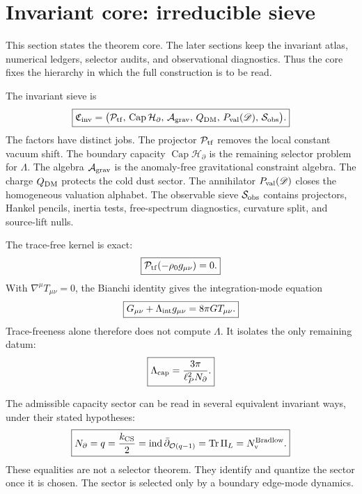 \documentclass[aps,prd,reprint,nofootinbib,superscriptaddress,floatfix]{revtex4-2}
\numberwithin{equation}{section}
\theoremstyle{definition}
\theoremstyle{plain}
\newcommand{\Dil}{\mathscr D}
\newcommand{\Agrav}{\mathcal A_{\rm grav}}
\newcommand{\Cinv}{\mathfrak C_{\rm inv}}
\newcommand{\Ncap}{N_{\partial}}
\newcommand{\Capacity}{\operatorname{Cap}}
\newcommand{\Ptr}{\mathcal P_{\rm tf}}
\begin{document}
\maketitle


\section{Invariant core: irreducible sieve}

This section states the theorem core.  The later sections keep the invariant atlas, numerical ledgers, selector audits, and observational diagnostics.  Thus the core fixes the hierarchy in which the full construction is to be read.

The invariant sieve is
\begin{equation}
\boxed{
\Cinv
=
\bigl(
\Ptr,\,
\Capacity\mathcal H_\partial,\,
\Agrav,\,
Q_{\rm DM},\,
P_{\rm val}(\Dil),\,
\mathcal S_{\rm obs}
\bigr).
}
\end{equation}
The factors have distinct jobs.  The projector \(\Ptr\) removes the local constant vacuum shift.  The boundary capacity \(\Capacity\mathcal H_\partial\) is the remaining selector problem for \(\Lambda\).  The algebra \(\Agrav\) is the anomaly-free gravitational constraint algebra.  The charge \(Q_{\rm DM}\) protects the cold dust sector.  The annihilator \(P_{\rm val}(\Dil)\) closes the homogeneous valuation alphabet.  The observable sieve \(\mathcal S_{\rm obs}\) contains projectors, Hankel pencils, inertia tests, free-spectrum diagnostics, curvature split, and source-lift nulls.

The trace-free kernel is exact:
\begin{equation}
\boxed{\Ptr(-\rho_0g_{\mu\nu})=0.}
\end{equation}
With \(\nabla^\mu T_{\mu\nu}=0\), the Bianchi identity gives the integration-mode equation
\begin{equation}
\boxed{
G_{\mu\nu}+\Lambda_{\rm int}g_{\mu\nu}=8\pi G T_{\mu\nu}.
}
\end{equation}
Trace-freeness alone therefore does not compute \(\Lambda\).  It isolates the only remaining datum:
\begin{equation}
\boxed{
\Lambda_{\rm cap}=\frac{3\pi}{\ell_P^2\Ncap}.
}
\end{equation}

The admissible capacity sector can be read in several equivalent invariant ways, under their stated hypotheses:
\begin{equation}
\boxed{
\Ncap
=
q
=
\frac{k_{\rm CS}}2
=
\operatorname{ind}\bar\partial_{\mathcal O(q-1)}
=
\operatorname{Tr}\Pi_L
=
N_{\rm v}^{\rm Bradlow}.
}
\end{equation}
These equalities are not a selector theorem.  They identify and quantize the sector once it is chosen.  The sector is selected only by a boundary edge-mode dynamics.
\end{document}
